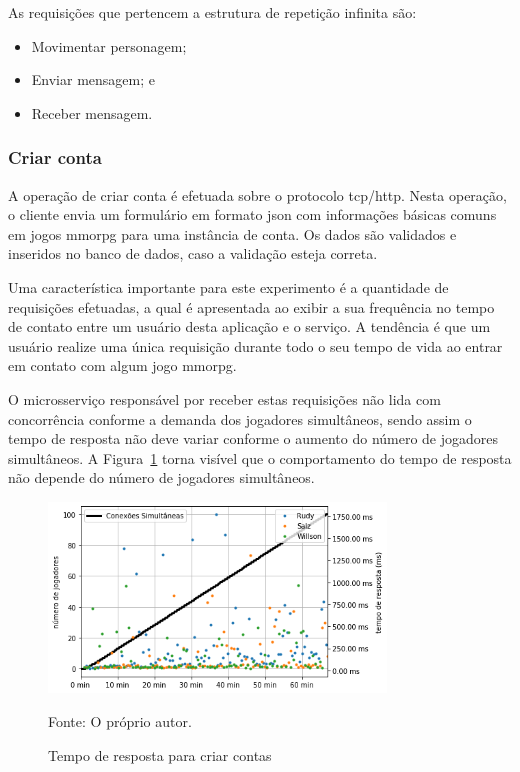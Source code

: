 As requisições que pertencem a estrutura de repetição infinita são:

\begin{itemize}
    \item Movimentar personagem;
    \item Enviar mensagem; e
    \item Receber mensagem.
\end{itemize}


\subsubsection{Criar conta}
\label{sec:op_create_account}

A operação de criar conta é efetuada sobre o protocolo \ac{tcp}/\ac{http}.
%
Nesta operação, o cliente envia um formulário em formato \ac{json} com informações básicas comuns em jogos \ac{mmorpg} para uma instância de conta.
%
Os dados são validados e inseridos no banco de dados, caso a validação esteja correta.

Uma característica importante para este experimento é a quantidade de requisições efetuadas, a qual é apresentada ao exibir a sua frequência no tempo de contato entre um usuário desta aplicação e o serviço.
%
A tendência é que um usuário realize uma única requisição durante todo o seu tempo de vida ao entrar em contato com algum jogo \ac{mmorpg}.

O microsserviço responsável por receber estas requisições não lida com concorrência conforme a demanda dos jogadores simultâneos, sendo assim o tempo de resposta não deve variar conforme o aumento do número de jogadores simultâneos.
%
A Figura~\ref{fig:create_account_operation_request_time} torna visível que o comportamento do tempo de resposta não depende do número de jogadores simultâneos.

\begin{figure}[htb!]
  \caption{Tempo de resposta para criar contas}
  \label{fig:create_account_operation_request_time}
  \includegraphics[width=0.8\textwidth]{figuras/analise/rt/create_account_operation_request_time.png}
  \centering

  Fonte: O próprio autor.
\end{figure}

